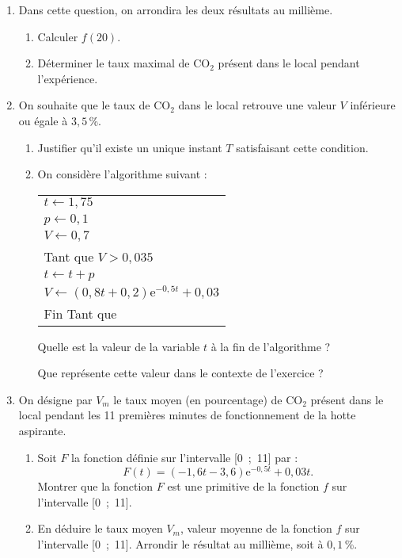 \begin{enumerate}
\item Dans cette question, on arrondira les deux résultats au millième.
	\begin{enumerate}[label=\alph*.]
		\item Calculer $f (20)$.
		\item Déterminer le taux maximal de CO$_2$ présent dans le local pendant l'expérience.
 	\end{enumerate}
\item  On souhaite que le taux de CO$_2$ dans le local retrouve une valeur $V$ inférieure ou égale à $3,5$\,\%.
	\begin{enumerate}[label=\alph*.]
		\item Justifier qu'il existe un unique instant $T$ satisfaisant cette condition.
		\item  On considère l'algorithme suivant :
\begin{center}
\begin{extern}%
\begin{tabularx}{0.6\linewidth}{|X|}\hline
$t \gets 1,75$\\
$p \gets 0,1$\\
$V \gets 0,7$\\
Tant que $V > 0,035$\\
\hspace{0.75cm}$t \gets t + p$\\
\hspace{0.75cm}$V \gets (0,8t + 0,2)\text{e}^{-0,5t} + 0,03$\\
Fin Tant que\\ \hline
\end{tabularx}
\end{extern}
\end{center}		
Quelle est la valeur de la variable $t$ à la fin de l'algorithme ?
\par		
Que représente cette valeur dans le contexte de l'exercice ?
 	\end{enumerate}
\item  On désigne par $V_m$ le taux moyen (en pourcentage) de CO$_2$ présent dans le local pendant les 11 premières minutes de fonctionnement de la hotte aspirante.
	\begin{enumerate}[label=\alph*.]
		\item Soit $F$ la fonction définie sur l'intervalle [0~;~11] par : 	
		\[F(t) = (-1,6t -3,6)\text{e}^{-0,5t} +0,03t.\]	
Montrer que la fonction $F$ est une primitive de la fonction $f$ sur l'intervalle [0~;~11].
		\item En déduire le taux moyen $V_m$, valeur moyenne de la fonction $f$ sur l'intervalle [0~;~11].
Arrondir le résultat au millième, soit à $0,1$\,\%.
	\end{enumerate}
\end{enumerate}
